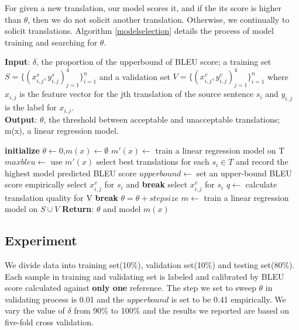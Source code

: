 \documentclass[11pt,letterpaper]{article}
\begin{document}
For given a new translation, our model scores it, and if the its score is higher than $\theta$, then we do not solicit another translation. Otherwise, we continually to solicit translations.  Algorithm \ref{modelselection} details the process of model training and searching for $\theta$. 
\begin{algorithm} [h!]
\caption{}\label{modelselection}
\textbf{Input}: $\delta$, the proportion of the upperbound of BLEU score; a training set $S = \{(x^{s}_{i,j},y^{s}_{i,j})_{j=1}^{4}\}_{i=1}^n$ and a validation set $V = \{(x^{v}_{i,j},y^{v}_{i,j})_{j=1}^{4}\}_{i=1}^n$ where $x_{i,j}$ is the feature vector for the jth translation of the source sentence $s_{i}$ and $y_{i,j}$ is the label for $x_{i,j}$.\\
\textbf{Output}: $\theta$, the threshold between acceptable and unacceptable translations; m(x), a linear regression model. 
\begin{algorithmic}[1]
\State \textbf{initialize} $\theta \leftarrow 0$,$m(x)\leftarrow \emptyset$ 
\State $m'(x)\leftarrow$ train a linear regression model on T
\State $maxbleu \leftarrow$ use $m'(x)$ select best translations for each $s_i \in T$ and record the highest model predicted BLEU score
\State $upperbound \leftarrow$ set an upper-bound BLEU score empirically
             select $x^{v}_{i,j}$ for $s_i$ and \textbf{break}
\EndIf
{} select $x^{v}_{i,j}$ for $s_i$
\EndIf
\EndFor
\EndFor
\State $q \leftarrow$ calculate translation quality for V
 \textbf{break}
\Else \text{  } $\theta = \theta + stepsize$
\EndIf
\EndWhile
\State $m \leftarrow$ train a linear regression model on $S \cup V$
\State \textbf{Return}: $\theta$ and model $m(x)$
\end{algorithmic}
\end{algorithm}


\subsection{Experiment}
 We divide data into training set(10\%), validation set(10\%) and testing set(80\%). Each sample in training and validating set is labeled and calibrated by BLEU score calculated against \textbf{only one} reference. The step we set to sweep $\theta$ in validating process is 0.01 and the $upperbound$ is set to be 0.41 empirically. We vary the value of $\delta$ from 90\% to 100\% and the results we reported are based on five-fold cross validation.
\end{document}
